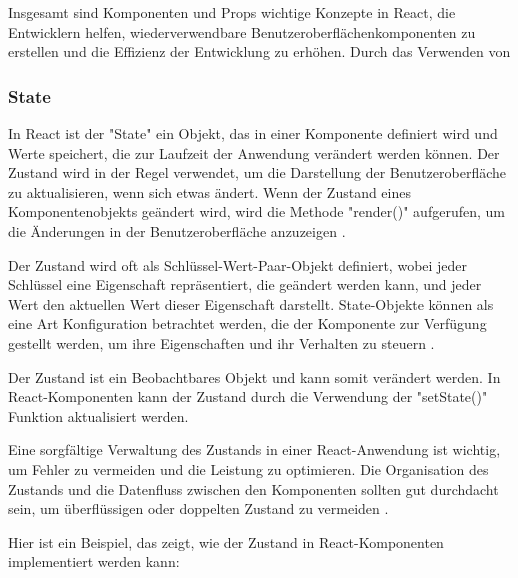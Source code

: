 Insgesamt sind Komponenten und Props wichtige Konzepte in React, die Entwicklern helfen, wiederverwendbare Benutzeroberflächenkomponenten zu erstellen und die Effizienz der Entwicklung zu erhöhen. Durch das Verwenden von
\subsubsection{State}
In React ist der "State" ein Objekt, das in einer Komponente definiert wird und Werte speichert, die zur Laufzeit der Anwendung verändert werden können. Der Zustand wird in der Regel verwendet, um die Darstellung der Benutzeroberfläche zu aktualisieren, wenn sich etwas ändert. Wenn der Zustand eines Komponentenobjekts geändert wird, wird die Methode "render()" aufgerufen, um die Änderungen in der Benutzeroberfläche anzuzeigen \cite{W3SchoolsReactState}.

Der Zustand wird oft als Schlüssel-Wert-Paar-Objekt definiert, wobei jeder Schlüssel eine Eigenschaft repräsentiert, die geändert werden kann, und jeder Wert den aktuellen Wert dieser Eigenschaft darstellt. State-Objekte können als eine Art Konfiguration betrachtet werden, die der Komponente zur Verfügung gestellt werden, um ihre Eigenschaften und ihr Verhalten zu steuern \cite{FreeCodeCampStateInReact}.

Der Zustand ist ein Beobachtbares Objekt und kann somit verändert werden. In React-Komponenten kann der Zustand durch die Verwendung der "setState()" Funktion aktualisiert werden.

Eine sorgfältige Verwaltung des Zustands in einer React-Anwendung ist wichtig, um Fehler zu vermeiden und die Leistung zu optimieren. Die Organisation des Zustands und die Datenfluss zwischen den Komponenten sollten gut durchdacht sein, um überflüssigen oder doppelten Zustand zu vermeiden \cite{ReactManagingState}.

Hier ist ein Beispiel, das zeigt, wie der Zustand in React-Komponenten implementiert werden kann:

